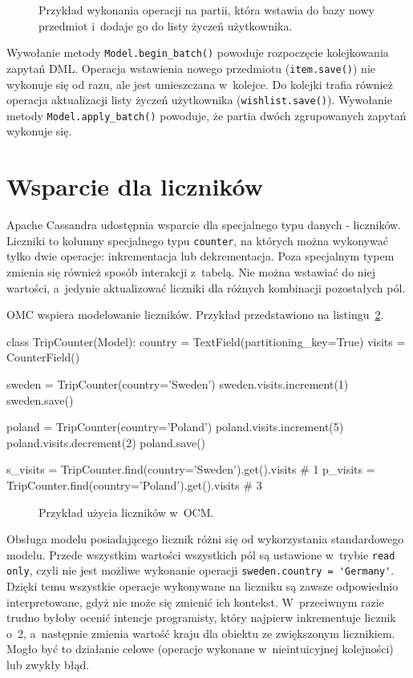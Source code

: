 \begin{figure}[ht!]
	\centering
	\theverbbox
	\caption{Przykład wykonania operacji na partii, która wstawia do bazy nowy przedmiot i~dodaje go do listy życzeń użytkownika.}
	\label{lst:ocm_batch_support}
\end{figure}

Wywołanie metody \verb+Model.begin_batch()+ powoduje rozpoczęcie kolejkowania zapytań DML. Operacja wstawienia nowego przedmiotu (\verb+item.save()+) nie wykonuje się od razu, ale jest umieszczana w~kolejce. Do kolejki trafia również operacja aktualizacji listy życzeń użytkownika (\verb+wishlist.save()+). Wywołanie metody \verb+Model.apply_batch()+ powoduje, że partia dwóch zgrupowanych zapytań wykonuje się.

\section{Wsparcie dla liczników}

Apache Cassandra udostępnia wsparcie dla specjalnego typu danych - liczników.~\cite{cassandra_counters} Liczniki to kolumny specjalnego typu \verb+counter+, na których można wykonywać tylko dwie operacje: inkrementacja lub dekrementacja. Poza specjalnym typem zmienia się również sposób interakcji z~tabelą. Nie można wstawiać do niej wartości, a~jedynie aktualizować liczniki dla różnych kombinacji pozostałych pól. 

OMC wspiera modelowanie liczników. Przykład przedstawiono na listingu~\ref{lst:ocm_counter_support}.

\begin{verbbox}
class TripCounter(Model):
    country = TextField(partitioning_key=True)
    visits = CounterField()

sweden = TripCounter(country='Sweden')
sweden.visits.increment(1)
sweden.save()

poland = TripCounter(country='Poland')
poland.visits.increment(5)
poland.visits.decrement(2)
poland.save()

s_visits = TripCounter.find(country='Sweden').get().visits    # 1
p_visits = TripCounter.find(country='Poland').get().visits    # 3
\end{verbbox}

\begin{figure}[ht!]
	\centering
	\theverbbox
	\caption{Przykład użycia liczników w~OCM.}
	\label{lst:ocm_counter_support}
\end{figure}

Obsługa modelu posiadającego licznik różni się od wykorzystania standardowego modelu. Przede wszystkim wartości wszystkich pól są ustawione w~trybie \verb+read only+, czyli nie jest możliwe wykonanie operacji \verb+sweden.country = 'Germany'+. Dzięki temu wszystkie operacje wykonywane na liczniku są zawsze odpowiednio interpretowane, gdyż nie może się zmienić ich kontekst. W~przeciwnym razie trudno byłoby ocenić intencje programisty, który najpierw inkrementuje licznik o~2, a~następnie zmienia wartość kraju dla obiektu ze zwiększonym licznikiem. Mogło być to działanie celowe (operacje wykonane w~nieintuicyjnej kolejności) lub zwykły błąd. 

